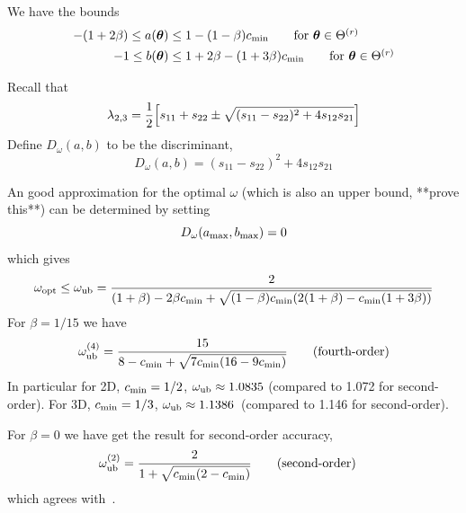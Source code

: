\documentclass{article}
\begin{document}
We have the bounds
\begin{align*}
-(1+2\beta) \le a(\boldsymbol{\theta}) &\le 1 - (1-\beta)c_{\rm min}  \qquad\mbox{for $\boldsymbol{\theta}\in\Theta^{(r)}$} \\
-1 \le b(\boldsymbol{\theta}) &\le 1+2\beta - (1+3\beta)c_{\rm min}  \qquad\mbox{for $\boldsymbol{\theta}\in\Theta^{(r)}$} 
\end{align*}

Recall that 
\[
  \lambda_{2,3} = {1\over 2}\Big[ s_{11}+s_{22} \pm \sqrt{ (s_{11}-s_{22})^2 + 4 s_{12}s_{21} } \Big]
\]
Define $D_\omega (a,b)$ to be the discriminant,
\[
    D_\omega (a,b) = (s_{11}-s_{22})^2 + 4 s_{12}s_{21}
\]

An good approximation for the optimal $\omega$ (which is also an upper bound, **prove this**) 
can be determined by setting
\[
   D_\omega (a_{\rm max},b_{\rm max}) = 0 
\]
which gives
\begin{align*}
   \omega_{\rm opt} \le \omega_{\rm ub} 
     &= { 2 \over (1+\beta)-2\beta c_{\rm min}+\sqrt{ (1-\beta) c_{\rm min} (2(1+\beta)-c_{\rm min}(1+3\beta)) } } \\
\end{align*}
For $\beta=1/15$ we have
\begin{align*}
   \omega_{\rm ub}^{(4)}  &= {15 \over 8-c_{\rm min}+ \sqrt{ 7c_{\rm min}(16-9c_{\rm min}) } } \qquad\mbox{(fourth-order)}\\
\end{align*}
In particular for 2D, $c_{\rm min}=1/2$, $\omega_{\rm ub}\approx 1.0835$ (compared to 1.072 for second-order).
For 3D, $c_{\rm min}=1/3$, $\omega_{\rm ub}\approx 1.1386$~(compared to 1.146 for second-order).

For $\beta=0$ we have get the result for second-order accuracy,
\begin{align*}
   \omega_{\rm ub}^{(2)}  & = {2 \over 1 + \sqrt{ c_{\rm min}(2-c_{\rm min}) } } \qquad\mbox{(second-order)}
\end{align*}
which agrees with~\cite{Yavneh96}.
\end{document}
